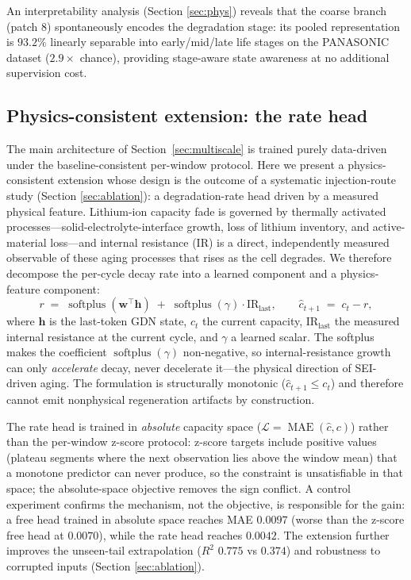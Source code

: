 An interpretability analysis (Section \ref{sec:phys}) reveals that
the coarse branch (patch 8) spontaneously encodes the degradation
stage: its pooled representation is $93.2\%$ linearly separable into
early/mid/late life stages on the PANASONIC dataset ($2.9\times$
chance), providing stage-aware state awareness at no additional
supervision cost.

\subsection{Physics-consistent extension: the rate head}
\label{sec:physics}

The main architecture of Section~\ref{sec:multiscale} is trained
purely data-driven under the baseline-consistent per-window protocol.
Here we present a physics-consistent extension whose design is the
outcome of a systematic injection-route study (Section
\ref{sec:ablation}): a degradation-rate head driven by a measured
physical feature. Lithium-ion capacity fade is governed by
thermally activated processes---solid-electrolyte-interface growth,
loss of lithium inventory, and active-material loss---and internal
resistance (IR) is a direct, independently measured observable of
these aging processes that rises as the cell degrades. We therefore
decompose the per-cycle decay rate into a learned component and a
physics-feature component:
\begin{equation}
\label{eq:rate_head}
r \;=\; \operatorname{softplus}(\mathbf{w}^{\top}\mathbf{h})
\;+\; \operatorname{softplus}(\gamma)\cdot \mathrm{IR}_{\text{last}},
\qquad
\hat{c}_{t+1} \;=\; c_t - r,
\end{equation}
where $\mathbf{h}$ is the last-token GDN state, $c_t$ the current
capacity, $\mathrm{IR}_{\text{last}}$ the measured internal
resistance at the current cycle, and $\gamma$ a learned scalar. The
softplus makes the coefficient $\operatorname{softplus}(\gamma)$
non-negative, so internal-resistance growth can only \emph{accelerate}
decay, never decelerate it---the physical direction of SEI-driven
aging. The formulation is structurally monotonic
($\hat{c}_{t+1} \le c_t$) and therefore cannot emit nonphysical
regeneration artifacts by construction.

The rate head is trained in \emph{absolute} capacity space
($\mathcal{L} = \operatorname{MAE}(\hat{c}, c)$) rather than the
per-window z-score protocol: z-score targets include positive values
(plateau segments where the next observation lies above the window
mean) that a monotone predictor can never produce, so the constraint
is unsatisfiable in that space; the absolute-space objective removes
the sign conflict. A control experiment confirms the mechanism, not
the objective, is responsible for the gain: a free head trained in
absolute space reaches MAE $0.0097$ (worse than the z-score free head
at $0.0070$), while the rate head reaches $0.0042$. The extension
further improves the unseen-tail extrapolation ($R^2$ $0.775$ vs
$0.374$) and robustness to corrupted inputs (Section
\ref{sec:ablation}).

